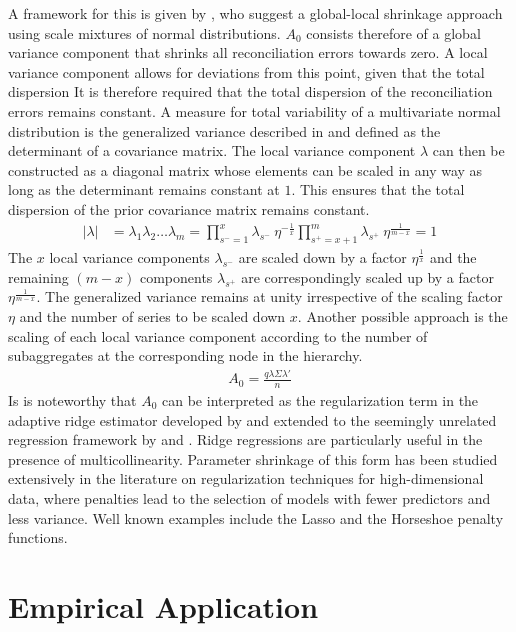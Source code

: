\documentclass[a4paper,fleqn,11pt]{article}
\begin{document}
A framework for this is given by \cite{Polson2010}, who suggest a global-local shrinkage approach using scale mixtures of normal distributions. $A_0$ consists therefore of a global variance component that shrinks all reconciliation errors towards zero. A local variance component allows for deviations from this point, given that the total dispersion It is therefore required that the total dispersion of the reconciliation errors remains constant.  A measure for total variability of a multivariate normal distribution is the generalized variance described in \cite{Mustonen1997} and defined as the determinant of a covariance matrix. The local variance component $\lambda$ can then be constructed as a diagonal matrix whose elements can be scaled in any way as long as the determinant remains constant at $1$. This ensures that the total dispersion of the prior covariance matrix remains constant.
\begin{align*}
|\lambda| &= \lambda_1 \lambda_2 \hdots \lambda_m
   	= \prod_{s^- = 1}^{x} \lambda_{s^-}\ \eta^{-\frac{1}{x}}   \prod_{s^+ = x+1}^{m} \lambda_{s^+}\ \eta^{\frac{1}{m-x}} = 1
\end{align*}
The $x$ local variance components $\lambda_{s^-}$ are scaled down by a factor $\eta^{\frac{1}{x}}$ and the remaining $(m-x)$ components $\lambda_{s^+}$ are correspondingly scaled up by a factor $\eta^{\frac{1}{m-x}}$. The generalized variance remains at unity irrespective of the scaling factor $\eta$ and the number of series to be scaled down $x$. Another possible approach is the scaling of each local variance component according to the number of subaggregates at the corresponding node in the hierarchy.
\begin{align}
    	A_0 =  \frac{q\lambda\Sigma\lambda'}{n}
\end{align}
Is is noteworthy that $A_0$ can be interpreted as the regularization term in the adaptive ridge estimator developed by \cite{Brown1980} and extended to the seemingly unrelated regression framework by \cite{Haitovsky1987} and \cite{Firinguetti1997}. Ridge regressions are particularly useful in the presence of multicollinearity. Parameter shrinkage of this form has been studied extensively in the literature on regularization techniques for high-dimensional data, where penalties lead to the selection of models with fewer predictors and less variance. Well known examples include the Lasso and the Horseshoe penalty functions.\\
\clearpage


\section{Empirical Application}
\end{document}
